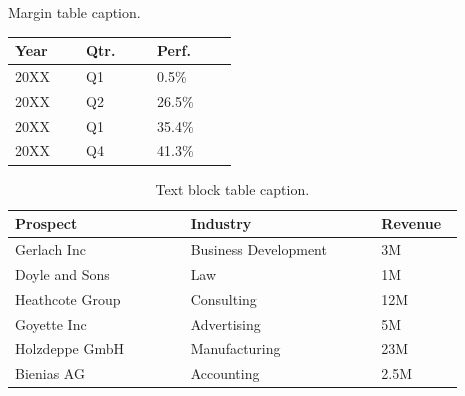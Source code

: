 \documentclass[
	a4paper, %
	12pt, %
]{include/CSSullivanBusinessReport}
\begin{document}

\begin{margintable} %
	\footnotesize %
	\caption{Margin table caption.}
	\begin{tabular}{L{0.22\linewidth} C{0.22\linewidth} R{0.25\linewidth}}
		\toprule
		\textbf{Year} & \textbf{Qtr.} & \textbf{Perf.}\\
		\midrule
		20XX & Q1 & 0.5\%\\
		20XX & Q2 & 26.5\%\\
		20XX & Q1 & 35.4\%\\
		20XX & Q4 & 41.3\%\\
		\bottomrule
	\end{tabular}
\end{margintable}


\begin{table}[H] %
	\caption{Text block table caption.}
	\begin{tabular}{L{0.35\linewidth} L{0.38\linewidth} L{0.16\linewidth}}
		\toprule
		\textbf{Prospect} & \textbf{Industry} & \textbf{Revenue} \\
		\midrule
		Gerlach Inc & Business Development & 3M\\
		Doyle and Sons & Law & 1M\\
		Heathcote Group & Consulting & 12M\\
		Goyette Inc & Advertising & 5M\\
		Holzdeppe GmbH & Manufacturing & 23M\\
		Bienias AG & Accounting & 2.5M\\
		\bottomrule
	\end{tabular}
	\label{tab:example}
\end{table}

\end{document}
